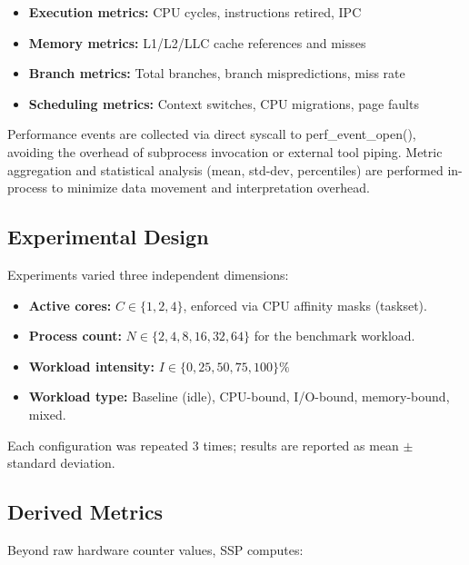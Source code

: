 \documentclass[conference]{IEEEtran}
\begin{document}
\begin{itemize}
  \item \textbf{Execution metrics:} CPU cycles, instructions retired, IPC
  \item \textbf{Memory metrics:} L1/L2/LLC cache references and misses
  \item \textbf{Branch metrics:} Total branches, branch mispredictions, miss rate
  \item \textbf{Scheduling metrics:} Context switches, CPU migrations, page faults
\end{itemize}

Performance events are collected via direct syscall to perf\_event\_open(),
avoiding the overhead of subprocess invocation or external tool piping. Metric
aggregation and statistical analysis (mean, std-dev, percentiles) are performed
in-process to minimize data movement and interpretation overhead.

\subsection{Experimental Design}

Experiments varied three independent dimensions:

\begin{itemize}
  \item \textbf{Active cores:} $C \in \{1, 2, 4\}$, enforced via CPU affinity
        masks (taskset).
  \item \textbf{Process count:} $N \in \{2, 4, 8, 16, 32, 64\}$ for the
        benchmark workload.
  \item \textbf{Workload intensity:} $I \in \{0, 25, 50, 75, 100\}\%$
  \item \textbf{Workload type:} Baseline (idle), CPU-bound, I/O-bound,
        memory-bound, mixed.
\end{itemize}

Each configuration was repeated 3 times; results are reported as mean $\pm$
standard deviation.

\subsection{Derived Metrics}

Beyond raw hardware counter values, SSP computes:
\end{document}

